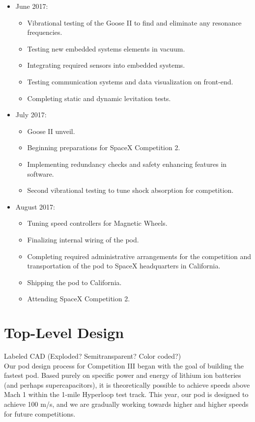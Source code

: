 \documentclass[main.tex]{subfiles}
\begin{document}
\begin{itemize}
\item June 2017:
\begin{itemize}
    \item Vibrational testing of the Goose II to find and eliminate any resonance frequencies.
    \item Testing new embedded systems elements in vacuum.
    \item Integrating required sensors into embedded systems.
    \item Testing communication systems and data visualization on front-end.
    \item Completing static and dynamic levitation tests.
\end{itemize}

\item July 2017:
\begin{itemize}
    \item Goose II unveil.
    \item Beginning preparations for SpaceX Competition 2.
    \item Implementing redundancy checks and safety enhancing features in software.
    \item Second vibrational testing to tune shock absorption for competition.
\end{itemize}

\item August 2017:
\begin{itemize}
    \item Tuning speed controllers for Magnetic Wheels.
    \item Finalizing internal wiring of the pod.
    \item Completing required administrative arrangements for the competition and transportation of the pod to SpaceX headquarters in California.
    \item Shipping the pod to California.
    \item Attending SpaceX Competition 2.
\end{itemize}

\end{itemize}

\chapter{Top-Level Design}
\label{ch:top-level-design}
Labeled CAD (Exploded? Semitransparent? Color coded?)\\

Our pod design process for Competition III began with the goal of building the fastest pod. Based purely on specific power and energy of lithium ion batteries (and perhaps supercapacitors), it is theoretically possible to achieve speeds above Mach 1 within the 1-mile Hyperloop test track. This year, our pod is designed to achieve 100 m/s, and we are gradually working towards higher and higher speeds for future competitions.
\end{document}

